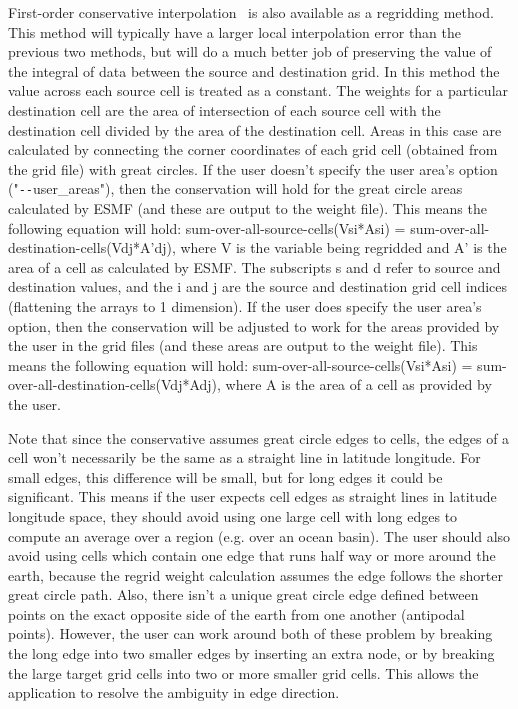 First-order conservative interpolation~\cite{ConservativeOrder1} is also available as a regridding method. This method will typically have  
a larger local interpolation error than the previous two methods, but will do a much better job of preserving the value of the 
integral of data between the source and destination grid. In this method the value across each source cell
is treated as a constant. The weights for a particular destination cell are the area of intersection of each 
source cell with the destination cell divided by the area of the destination cell.
Areas in this case are calculated by connecting the corner coordinates of each grid cell (obtained from the grid file) with great circles. If the user doesn't specify
the user area's option ("\verb+--+user\_areas"), then the conservation will hold for the great circle areas calculated by 
ESMF (and these are output to the weight file). This means the following equation will hold:  sum-over-all-source-cells(Vsi*Asi) = sum-over-all-destination-cells(Vdj*A'dj), where
V is the variable being regridded and A' is the area of a cell as calculated by ESMF.  The subscripts s and d refer to source and destination values, and the i and j are the source 
and destination grid cell indices (flattening the arrays to 1 dimension). If the user does specify the user area's option, then the conservation will be adjusted to work for the areas 
provided by the user in the grid files (and these areas are output to the weight file). This means the following equation will hold:  sum-over-all-source-cells(Vsi*Asi) = sum-over-all-destination-cells(Vdj*Adj), where A is the area of a cell as provided by the user.  

Note that since the conservative assumes great circle edges to cells, the edges of a cell won't necessarily be
the same as a straight line in latitude longitude. For small edges, this difference will be small, but for long edges it could be significant. This means if
the user expects cell edges as straight lines in latitude longitude space, they should avoid using one large cell with long edges to compute an average over a region (e.g. over an ocean basin). The 
user should also avoid using cells which contain one edge that runs half way or more around the earth, because the regrid weight calculation assumes the 
edge follows the shorter great circle path. Also, there isn't a unique great circle edge defined between points on the exact opposite side of the earth from one another (antipodal points). 
However, the user can work around both of these problem by breaking the long edge into two smaller edges by inserting an extra node, or by breaking the large target grid cells into two or more smaller grid cells. 
This allows the application to resolve the ambiguity in edge direction. 

